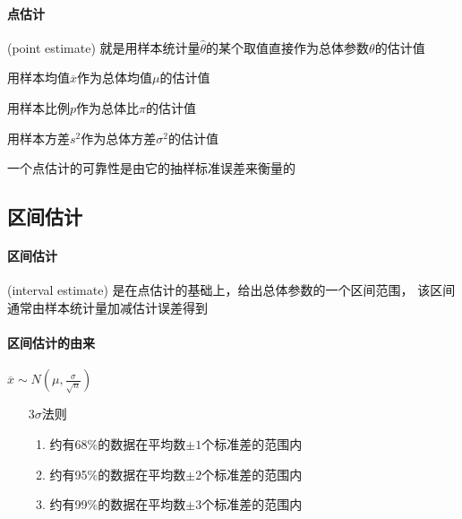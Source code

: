 \documentclass[UTF8,10pt]{book}
\begin{document}
            \paragraph{点估计} (point estimate) 就是用样本统计量$\hat{\theta}$的某个取值直接作为总体参数$\theta$的估计值

            {\kaishu
            用样本均值$\overline{x}$作为总体均值$\mu$的估计值

            用样本比例$p$作为总体比$\pi$的估计值

            用样本方差$s^2$作为总体方差$\sigma^2$的估计值}

            一个点估计的{\kaishu 可靠性}是由它的{\kaishu 抽样标准误差}来衡量的
            

        \subsection{区间估计}

            \paragraph{区间估计} (interval estimate) 是在{\kaishu 点估计}的基础上，给出总体参数的一个区间范围，
            该区间通常由{\kaishu 样本统计量}加减{\kaishu 估计误差}得到

            \paragraph{区间估计的由来} $\overline{x} \sim N(\mu,\frac{\sigma}{\sqrt{n}})$
                \begin{itemize}
                    \item [$3\sigma$法则] {
                        \begin{enumerate}
                            \item 约有68\%的数据在平均数$\pm 1$个标准差的范围内
                            \item 约有95\%的数据在平均数$\pm 2$个标准差的范围内
                            \item 约有99\%的数据在平均数$\pm 3$个标准差的范围内
                        
                        \end{enumerate}
                    }
                \end{itemize}
\end{document}
